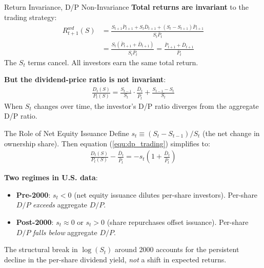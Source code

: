 \documentclass{beamer}
\begin{document}
\begin{frame}{Return Invariance, D/P Non-Invariance}
	\textbf{Total returns are invariant} to the trading strategy:
	\begin{align*}
		R_{t+1}^{wd}(S) &= \frac{S_{t+1}\bar{P}_{t+1} + S_t\bar{D}_{t+1} + (S_t - S_{t+1})\bar{P}_{t+1}}{S_t \bar{P}_t} \\
		&= \frac{S_t(\bar{P}_{t+1} + \bar{D}_{t+1})}{S_t \bar{P}_t} = \frac{\bar{P}_{t+1} + \bar{D}_{t+1}}{\bar{P}_t}
	\end{align*}
	The $S_t$ terms cancel. All investors earn the same total return.

	\vspace{5pt}
	\textbf{But the dividend-price ratio is not invariant}:
	\begin{align}
		\frac{D_t(S)}{P_t(S)} = \frac{S_{t-1}}{S_t} \cdot \frac{\bar{D}_t}{\bar{P}_t} + \frac{S_{t-1} - S_t}{S_t} \label{equ:dp_trading}
	\end{align}
	When $S_t$ changes over time, the investor's D/P ratio diverges from the aggregate D/P ratio.
\end{frame}

\begin{frame}{The Role of Net Equity Issuance}
	Define $s_t \equiv (S_t - S_{t-1})/S_t$ (the net change in ownership share). Then equation (\ref{equ:dp_trading}) simplifies to:
	\begin{align}
		\frac{D_t(S)}{P_t(S)} - \frac{\bar{D}_t}{\bar{P}_t} = -s_t\left(1 + \frac{\bar{D}_t}{\bar{P}_t}\right) \label{equ:dp_wedge}
	\end{align}

	\textbf{Two regimes in U.S. data}:
	\begin{itemize}
		\item \textbf{Pre-2000}: $s_t < 0$ (net equity issuance dilutes per-share investors). Per-share $D/P$ \textit{exceeds} aggregate $D/P$.
		\item \textbf{Post-2000}: $s_t \approx 0$ or $s_t > 0$ (share repurchases offset issuance). Per-share $D/P$ \textit{falls below} aggregate $D/P$.
	\end{itemize}

	\vspace{3pt}
	The structural break in $\log(S_t)$ around 2000 accounts for the persistent decline in the per-share dividend yield, \textit{not} a shift in expected returns.
\end{frame}
\end{document}

